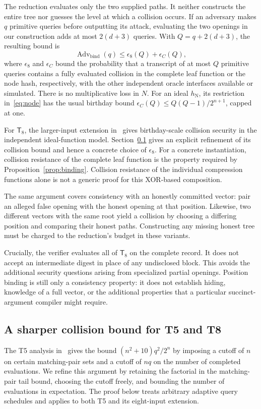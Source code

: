 \documentclass[11pt,letterpaper]{article}
\theoremstyle{definition} %
\newcommand{\Tate}{\mathsf{T}_{8}}
\newcommand{\mtadv}{\operatorname{Adv}}
\begin{document}
The reduction evaluates only the two supplied paths. It neither constructs
the entire tree nor guesses the level at which a collision occurs. If an
adversary makes $q$ primitive queries before outputting its attack, evaluating
the two openings in our construction adds at most $2(d+3)$ queries. With
$Q=q+2(d+3)$, the resulting bound is
\begin{equation}
 \mtadv_{\mathrm{bind}}(q)
 \leq\epsilon_8(Q)+\epsilon_C(Q),
 \label{eq:binding}
\end{equation}
where $\epsilon_8$ and $\epsilon_C$ bound the probability that a transcript
of at most $Q$ primitive queries contains a fully evaluated collision in
the complete leaf function or the node hash, respectively, with the other
independent oracle interfaces available or simulated. There is no
multiplicative loss in $N$. For an ideal $h_{\mathrm N}$, its restriction
in~\eqref{eq:node} has the usual birthday bound
$\epsilon_C(Q)\leq Q(Q-1)/2^{n+1}$, capped at one.

For $\Tate$, the larger-input extension in~\cite{DKMN21} gives
birthday-scale collision security in the independent ideal-function model.
Section~\ref{sec:collision-bound} gives an explicit refinement of its
collision bound and hence a concrete choice of $\epsilon_8$.
For a concrete instantiation, collision resistance of the complete leaf
function is the property required by Proposition~\ref{prop:binding}.
Collision resistance of the individual compression functions alone is not
a generic proof for this XOR-based composition.

The same argument covers consistency with an honestly committed vector:
pair an alleged false opening with the honest opening at that position.
Likewise, two different vectors with the same root yield a collision by
choosing a differing position and comparing their honest paths. Constructing
any missing honest tree must be charged to the reduction's budget in these
variants.

Crucially, the verifier evaluates all of $\Tate$ on the complete record.
It does not accept an intermediate digest in place of any undisclosed block.
This avoids the additional security questions arising from specialized
partial openings. Position binding is still only a consistency property:
it does not establish hiding, knowledge of a full vector, or the additional
properties that a particular succinct-argument compiler might require.

\subsection{A sharper collision bound for T5 and T8}
\label{sec:collision-bound}
The T5 analysis in~\cite[Appendix~A]{DKMN21} gives the bound
$(n^2+10)q^2/2^n$ by imposing a cutoff of $n$ on certain matching-pair
sets and a cutoff of $nq$ on the number of completed evaluations.
We refine this argument by retaining the factorial in the matching-pair
tail bound, choosing the cutoff freely, and bounding the number of
evaluations in expectation. The proof below treats arbitrary adaptive
query schedules and applies to both T5 and its eight-input extension.
\end{document}

